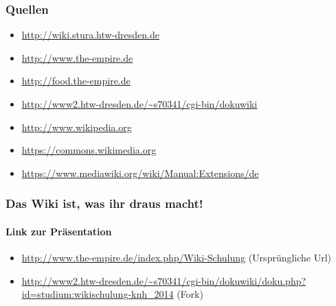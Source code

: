 \documentclass{beamer}
\begin{document}
\begin{frame}
  \frametitle{Quellen}

  \begin{itemize}
    \item \url{http://wiki.stura.htw-dresden.de}
    \item \url{http://www.the-empire.de}
    \item \url{http://food.the-empire.de}
    \item \url{http://www2.htw-dresden.de/~s70341/cgi-bin/dokuwiki}
    \item \url{http://www.wikipedia.org}
    \item \url{https://commons.wikimedia.org}
    \item \url{https://www.mediawiki.org/wiki/Manual:Extensions/de}
  \end{itemize}
\end{frame}

\begin{frame}
  \frametitle{Das Wiki ist, was ihr draus macht!}
  \framesubtitle{Link zur Präsentation}

  \begin{itemize}
    \item \url{http://www.the-empire.de/index.php/Wiki-Schulung} (Ursprüngliche Url)
    \item \url{http://www2.htw-dresden.de/~s70341/cgi-bin/dokuwiki/doku.php?id=studium:wikischulung-knh_2014} (Fork)
  \end{itemize}

\end{frame}
\end{document}

